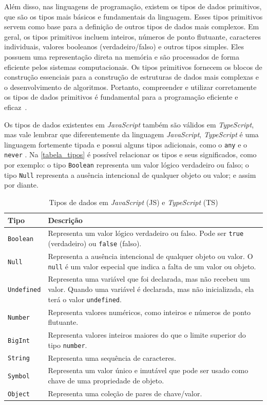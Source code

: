 Além disso, nas linguagens de programação, existem os tipos de dados primitivos, que são os tipos mais básicos e fundamentais da linguagem. Esses tipos primitivos servem como base para a definição de outros tipos de dados mais complexos. Em geral, os tipos primitivos incluem inteiros, números de ponto flutuante, caracteres individuais, valores booleanos (verdadeiro/falso) e outros tipos simples. Eles possuem uma representação direta na memória e são processados de forma eficiente pelos sistemas computacionais. Os tipos primitivos fornecem os blocos de construção essenciais para a construção de estruturas de dados mais complexas e o desenvolvimento de algoritmos. Portanto, compreender e utilizar corretamente os tipos de dados primitivos é fundamental para a programação eficiente e eficaz~\cite{devmedia_tipoprimitivo, wikipedia_primitivedatatype}.

Os tipos de dados existentes em \textit{JavaScript} também são válidos em \textit{TypeScript}, mas vale lembrar que diferentemente da linguagem \textit{JavaScript}, \textit{TypeScript} é uma linguagem fortemente tipada e possui alguns tipos adicionais, como o \texttt{any} e o \texttt{never} \cite{vidafullstack, site_typescript, javascript_mdn}. Na \autoref{tabela_tipos} é possível relacionar os tipos e seus significados, como por exemplo: o tipo \texttt{Boolean} representa um valor lógico verdadeiro ou falso; o tipo \texttt{Null} representa a ausência intencional de qualquer objeto ou valor; e assim por diante.


\begin{table}
\centering
\caption{Tipos de dados em \textit{JavaScript} (JS) e \textit{TypeScript} (TS)}

\begin{tabular}{|p{2cm}|p{9cm}|}
\hline
\textbf{Tipo} & \textbf{Descrição} \\
\hline
\texttt{Boolean} & Representa um valor lógico verdadeiro ou falso. Pode ser \texttt{true} (verdadeiro) ou \texttt{false} (falso). \\
\hline
\texttt{Null} & Representa a ausência intencional de qualquer objeto ou valor. O \texttt{null} é um valor especial que indica a falta de um valor ou objeto. \\
\hline
\texttt{Undefined} & Representa uma variável que foi declarada, mas não recebeu um valor. Quando uma variável é declarada, mas não inicializada, ela terá o valor \texttt{undefined}. \\
\hline
\texttt{Number} & Representa valores numéricos, como inteiros e números de ponto flutuante. \\
\hline
\texttt{BigInt} & Representa valores inteiros maiores do que o limite superior do tipo \texttt{number}. \\
\hline
\texttt{String} & Representa uma sequência de caracteres. \\
\hline
\texttt{Symbol} & Representa um valor único e imutável que pode ser usado como chave de uma propriedade de objeto. \\
\hline
\texttt{Object} & Representa uma coleção de pares de chave/valor. \\
\hline
\end{tabular}
\label{tabela_tipos}
\end{table}


